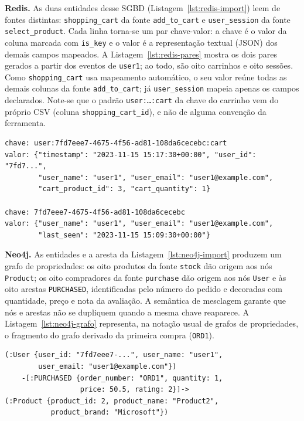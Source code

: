 \textbf{Redis.} As duas entidades desse SGBD (Listagem~\ref{lst:redis-import}) leem de
fontes distintas: \texttt{shopping\_cart} da fonte \texttt{add\_to\_cart} e
\texttt{user\_session} da fonte \texttt{select\_product}. Cada linha torna-se um par
chave-valor: a chave é o valor da coluna marcada com \texttt{is\_key} e o valor é a
representação textual (JSON) dos demais campos mapeados. A Listagem~\ref{lst:redis-pares}
mostra os dois pares gerados a partir dos eventos de \texttt{user1}; ao todo, são oito
carrinhos e oito sessões. Como \texttt{shopping\_cart} usa mapeamento automático, o seu
valor reúne todas as demais colunas da fonte \texttt{add\_to\_cart}; já
\texttt{user\_session} mapeia apenas os campos declarados. Note-se que o padrão
\texttt{user:\ldots:cart} da chave do carrinho vem do próprio CSV (coluna
\texttt{shopping\_cart\_id}), e não de alguma convenção da ferramenta.

\begin{lstlisting}[style=textstyle,caption={Pares chave-valor gerados no Redis a partir dos eventos de \texttt{user1}.},label={lst:redis-pares}]
chave: user:7fd7eee7-4675-4f56-ad81-108da6cecebc:cart
valor: {"timestamp": "2023-11-15 15:17:30+00:00", "user_id": "7fd7...",
        "user_name": "user1", "user_email": "user1@example.com",
        "cart_product_id": 3, "cart_quantity": 1}

chave: 7fd7eee7-4675-4f56-ad81-108da6cecebc
valor: {"user_name": "user1", "user_email": "user1@example.com",
        "last_seen": "2023-11-15 15:09:30+00:00"}
\end{lstlisting}

\textbf{Neo4j.} As entidades e a aresta da Listagem~\ref{lst:neo4j-import} produzem um
grafo de propriedades: os oito produtos da fonte \texttt{stock} dão origem aos nós
\texttt{Product}; os oito compradores da fonte \texttt{purchase} dão origem aos nós
\texttt{User} e às oito arestas \texttt{PURCHASED}, identificadas pelo número do pedido e
decoradas com quantidade, preço e nota da avaliação. A semântica de mesclagem garante que
nós e arestas não se dupliquem quando a mesma chave reaparece. A
Listagem~\ref{lst:neo4j-grafo} representa, na notação usual de grafos de propriedades, o
fragmento do grafo derivado da primeira compra (\texttt{ORD1}).

\begin{lstlisting}[style=textstyle,caption={Fragmento do grafo gravado no Neo4j para o pedido \texttt{ORD1}.},label={lst:neo4j-grafo}]
(:User {user_id: "7fd7eee7-...", user_name: "user1",
        user_email: "user1@example.com"})
    -[:PURCHASED {order_number: "ORD1", quantity: 1,
                  price: 50.5, rating: 2}]->
(:Product {product_id: 2, product_name: "Product2",
           product_brand: "Microsoft"})
\end{lstlisting}

